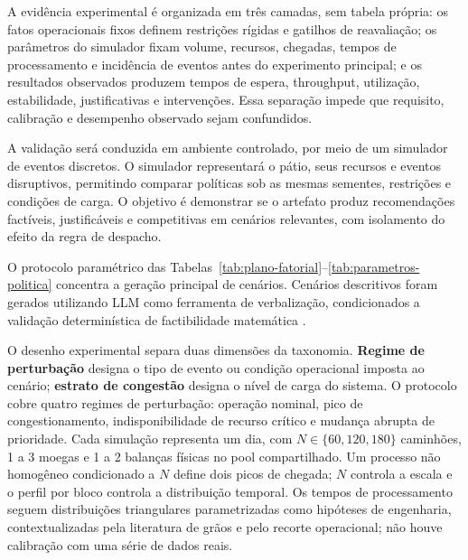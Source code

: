 \documentclass[
  12pt,
  oneside,
  a4paper,
  sumario=tradicional,
  brazil
]{abntex2}
\begin{document}
A evid\^encia experimental \'e organizada em tr\^es camadas, sem tabela pr\'opria: os fatos operacionais fixos definem restri\c{c}\~oes r\'igidas e gatilhos de reavalia\c{c}\~ao; os par\^ametros do simulador fixam volume, recursos, chegadas, tempos de processamento e incid\^encia de eventos antes do experimento principal; e os resultados observados produzem tempos de espera, throughput, utiliza\c{c}\~ao, estabilidade, justificativas e interven\c{c}\~oes. Essa separa\c{c}\~ao impede que requisito, calibra\c{c}\~ao e desempenho observado sejam confundidos.

A valida\c{c}\~ao ser\'a conduzida em ambiente controlado, por meio de um simulador de eventos discretos. O simulador representar\'a o p\'atio, seus recursos e eventos disruptivos, permitindo comparar pol\'iticas sob as mesmas sementes, restri\c{c}\~oes e condi\c{c}\~oes de carga. O objetivo \'e demonstrar se o artefato produz recomenda\c{c}\~oes fact\'iveis, justific\'aveis e competitivas em cen\'arios relevantes, com isolamento do efeito da regra de despacho.

O protocolo param\'etrico das Tabelas~\ref{tab:plano-fatorial}--\ref{tab:parametros-politica} concentra a gera\c{c}\~ao principal de cen\'arios. Cen\'arios descritivos foram gerados utilizando LLM como ferramenta de verbaliza\c{c}\~ao, condicionados a valida\c{c}\~ao determin\'istica de factibilidade matem\'atica \parencite{huangORLMCustomizableFramework2025a}.

O desenho experimental separa duas dimens\~oes da taxonomia. \textbf{Regime de perturba\c{c}\~ao} designa o tipo de evento ou condi\c{c}\~ao operacional imposta ao cen\'ario; \textbf{estrato de congest\~ao} designa o n\'ivel de carga do sistema. O protocolo cobre quatro regimes de perturba\c{c}\~ao: opera\c{c}\~ao nominal, pico de congestionamento, indisponibilidade de recurso cr\'itico e mudan\c{c}a abrupta de prioridade. Cada simula\c{c}\~ao representa um dia, com $N \in \{60,120,180\}$ caminh\~oes, 1 a 3 moegas e 1 a 2 balan\c{c}as f\'isicas no pool compartilhado. Um processo n\~ao homog\^eneo condicionado a $N$ define dois picos de chegada; $N$ controla a escala e o perfil por bloco controla a distribui\c{c}\~ao temporal. Os tempos de processamento seguem distribui\c{c}\~oes triangulares parametrizadas como hip\'oteses de engenharia, contextualizadas pela literatura de gr\~aos e pelo recorte operacional; n\~ao houve calibra\c{c}\~ao com uma s\'erie de dados reais.
\end{document}
